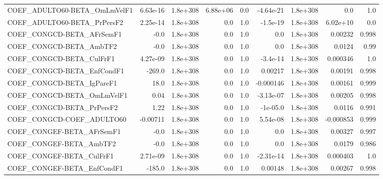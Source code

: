 \begin{tabular}{lrrrrrrrr}
COEF\_ADULTO60-BETA\_OmLmVelF1          &    6.63e-16 &     1.8e+308 &   6.88e+06 &      0.0 &  -4.64e-21 &    1.8e+308 &          0.0 &           1.0 \\
COEF\_ADULTO60-BETA\_PrPersF2           &    2.25e-14 &     1.8e+308 &        0.0 &      1.0 &   -1.5e-19 &    1.8e+308 &     6.02e+10 &           0.0 \\
COEF\_CONGCD-BETA\_AFrSemF1             &        -0.0 &     1.8e+308 &        0.0 &      1.0 &        0.0 &    1.8e+308 &      0.00232 &         0.998 \\
COEF\_CONGCD-BETA\_AmbTF2               &        -0.0 &     1.8e+308 &        0.0 &      1.0 &        0.0 &    1.8e+308 &       0.0124 &          0.99 \\
COEF\_CONGCD-BETA\_CulFrF1              &    4.27e-09 &     1.8e+308 &        0.0 &      1.0 &   -3.4e-14 &    1.8e+308 &     0.000346 &           1.0 \\
COEF\_CONGCD-BETA\_EnfCondF1            &      -269.0 &     1.8e+308 &        0.0 &      1.0 &    0.00217 &    1.8e+308 &      0.00191 &         0.998 \\
COEF\_CONGCD-BETA\_IgPareF1             &        18.0 &     1.8e+308 &        0.0 &      1.0 &  -0.000146 &    1.8e+308 &      0.00161 &         0.999 \\
COEF\_CONGCD-BETA\_OmLmVelF1            &        0.04 &     1.8e+308 &        0.0 &      1.0 &  -3.13e-07 &    1.8e+308 &      0.00205 &         0.998 \\
COEF\_CONGCD-BETA\_PrPersF2             &        1.22 &     1.8e+308 &        0.0 &      1.0 &   -1e-05.0 &    1.8e+308 &       0.0116 &         0.991 \\
COEF\_CONGCD-COEF\_ADULTO60             &    -0.00711 &     1.8e+308 &        0.0 &      1.0 &   5.54e-08 &    1.8e+308 &    -0.000853 &         0.999 \\
COEF\_CONGEF-BETA\_AFrSemF1             &        -0.0 &     1.8e+308 &        0.0 &      1.0 &        0.0 &    1.8e+308 &      0.00327 &         0.997 \\
COEF\_CONGEF-BETA\_AmbTF2               &        -0.0 &     1.8e+308 &        0.0 &      1.0 &        0.0 &    1.8e+308 &       0.0179 &         0.986 \\
COEF\_CONGEF-BETA\_CulFrF1              &    2.71e-09 &     1.8e+308 &        0.0 &      1.0 &  -2.31e-14 &    1.8e+308 &     0.000403 &           1.0 \\
COEF\_CONGEF-BETA\_EnfCondF1            &      -185.0 &     1.8e+308 &        0.0 &      1.0 &    0.00148 &    1.8e+308 &      0.00267 &         0.998 \\

\end{tabular}
